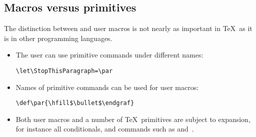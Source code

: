 \documentclass[letterpaper]{book}
\begin{document}
\subsection{Macros versus primitives}

%     
The distinction between  and user macros is not
nearly as important in \TeX\ as it is in other programming
languages.
\begin{itemize}
\item The user can use primitive commands under different names:
     
\begin{verbatim}
\let\StopThisParagraph=\par
\end{verbatim}
\item Names of primitive commands can be used for
      user macros:
\begin{verbatim}
\def\par{\hfill$\bullet$\endgraf}
\end{verbatim}
\item Both user macros and a number of \TeX\ primitives
      are subject to expansion, for instance all conditionals,
      and commands such as  and~.
\end{itemize}
\end{document}
